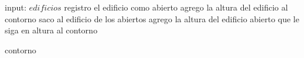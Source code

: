 \begin{algorithm}
\begin{algorithmic}
	\STATE input: $edificios$
			\STATE registro el edificio como abierto
				\STATE agrego la altura del edificio al contorno
			\ENDIF 
		\ELSE
			\STATE saco al edificio de los abiertos
				\STATE agrego la altura del edificio abierto que le siga en altura al contorno
			\ENDIF
		\ENDIF
	\ENDWHILE
	
	\RETURN contorno
\end{algorithmic}
\end{algorithm}